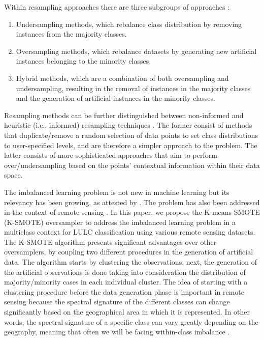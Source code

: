 \documentclass[parskip=full]{scrartcl}
\begin{document}
Within resampling approaches there are three subgroups of approaches
\cite{Fernandez2013,Kaur2019,Luengo2020}:

\begin{enumerate}
    \item Undersampling methods, which rebalance class distribution by removing
        instances from the majority classes.
    \item Oversampling methods, which rebalance datasets by generating new
        artificial instances belonging to the minority classes.
    \item Hybrid methods, which are a combination of both oversampling and
        undersampling, resulting in the removal of instances in the majority
        classes and the generation of artificial instances in the minority
        classes.
\end{enumerate}

Resampling methods can be further distinguished between non-informed and
heuristic (i.e., informed) resampling techniques
\cite{Fernandez2013,Luengo2020,Garcia2016}. The former consist of methods that
duplicate/remove a random selection of data points to set class distributions to
user-specified levels, and are therefore a simpler approach to the problem. The
latter consists of more sophisticated approaches that aim to perform
over/undersampling based on the points' contextual information within their data
space.

The imbalanced learning problem is not new in machine learning but its
relevancy has been growing, as attested by \cite{Haixiang2017}. The problem
has also been addressed in the context of remote sensing \cite{Douzas2019rs}.
In this paper, we propose the K-means SMOTE (K-SMOTE) \cite{Douzas2018}
oversampler to address the imbalanced learning problem in a multiclass context
for LULC classification using various remote sensing datasets. The K-SMOTE
algorithm presents significant advantages over other oversamplers, by coupling
two different procedures in the generation of artificial data. The algorithm
starts by clustering the observations; next, the generation of the artificial
observations is done taking into consideration the distribution of
majority/minority cases in each individual cluster. The idea of starting with
a clustering procedure before the data generation phase is important in
remote sensing because the spectral signature of the different classes can
change significantly based on the geographical area in which it is represented.
In other words, the spectral signature of a specific class can vary greatly
depending on the geography, meaning that often we will be facing within-class
imbalance \cite{Japkowicz2001}.
\end{document}
